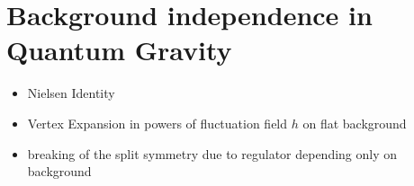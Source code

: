 \chapter{Background independence in Quantum Gravity}\label{chap:BGindependence}
\begin{itemize}
	\item Nielsen Identity 
	\item Vertex Expansion in powers of fluctuation field $h$ on flat background 
	\item breaking of the split symmetry due to regulator depending only on background
\end{itemize}
 